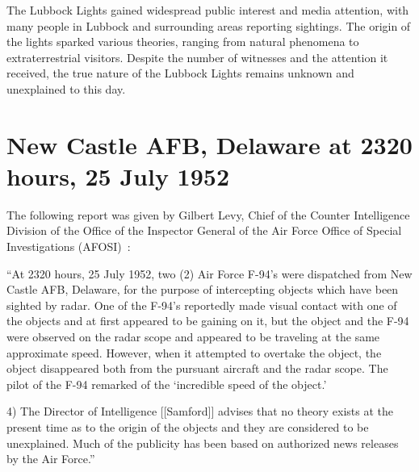 The Lubbock Lights gained widespread public interest and media attention, with many people in Lubbock and surrounding areas reporting sightings. The origin of the lights sparked various theories, ranging from natural phenomena to extraterrestrial visitors. Despite the number of witnesses and the attention it received, the true nature of the Lubbock Lights remains unknown and unexplained to this day.

\section{New Castle AFB, Delaware at 2320 hours, 25 July 1952}

\label{2023-UFO-part-History-chapter-post-1945-pre-1953.tex-ncd}

The following report was given by Gilbert Levy, Chief of the Counter Intelligence
Division of the Office of the Inspector General of the Air Force Office of Special Investigations (AFOSI)~\cite{Maccabee-1952}:
\begin{svgraybox}
``At 2320 hours, 25 July 1952, two (2) Air Force F-94's were dispatched from New Castle AFB, Delaware, for the purpose of intercepting objects which have been sighted by radar. One of the F-94's reportedly made visual contact with one of the objects and at first appeared to be gaining on it, but the object and the F-94 were observed on the radar scope
and appeared to be traveling at the same approximate speed. However, when it attempted to overtake the object, the object disappeared both from the pursuant aircraft and the radar scope. The pilot of the F-94 remarked of  the `incredible speed of the object.'

4) The Director of Intelligence [[Samford]] advises that no theory exists at the present time as to the origin of the objects
and they are considered to be unexplained.
Much of the publicity has been based on authorized news releases by the Air Force.''
\end{svgraybox}


